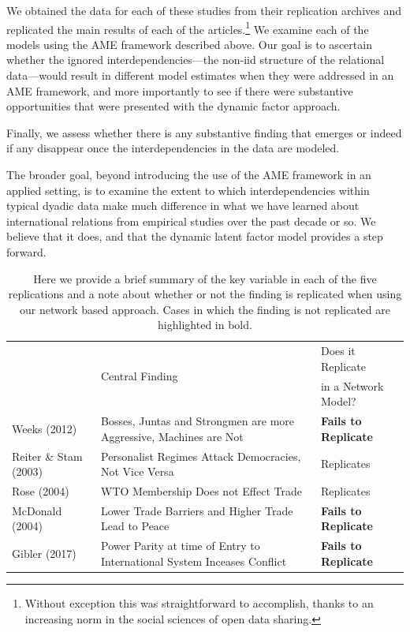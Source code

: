 \documentclass[12pt]{amsart}
\begin{document}
We obtained the data for each of these studies from their replication archives and replicated the main results of each of the articles.\footnote{Without exception this was straightforward to accomplish, thanks to an increasing norm in the social sciences of open data sharing.} We examine each of the models using the AME framework described above.  Our goal is to ascertain whether the ignored interdependencies---the non-iid structure of the relational data---would result in different model estimates when they were addressed in an AME framework, and more importantly to see if there were substantive opportunities that were presented with the dynamic factor approach.  

Finally, we assess whether there is any substantive finding that emerges or indeed if any disappear once the interdependencies in the data are modeled.

The broader goal, beyond introducing the use of the AME framework in an applied setting, is to examine the extent to which interdependencies within typical dyadic data make much difference in what we have learned about international relations from empirical studies over the past decade or so.  We believe that it does, and that the dynamic latent factor model provides a step forward.

\begin{table}[ht]
\centering
	\begin{tabular}{l| p{7cm} l}
	& \multirow{2}{*}{Central Finding} & Does it Replicate \\ 
	& &  in a Network Model? \\
	\hline\hline
		Weeks (2012) & Bosses, Juntas and Strongmen are more Aggressive, Machines are Not & \textbf{Fails to Replicate} \\
		\hline
		Reiter \& Stam (2003) & Personalist Regimes Attack Democracies, Not Vice Versa & Replicates \\ 
		\hline
		Rose (2004) & WTO Membership Does not Effect Trade & Replicates \\ 
		\hline
		McDonald (2004) & Lower Trade Barriers and Higher Trade Lead to Peace & \textbf{Fails to Replicate} \\ 
		\hline
		Gibler (2017) & Power Parity at time of Entry to International System Inceases Conflict & \textbf{Fails to Replicate} \\ 
	\hline\hline
	\end{tabular}
	\caption{Here we provide a brief summary of the key variable in each of the five replications and a note about whether or not the finding is replicated when using our network based approach. Cases in which the finding is not replicated are highlighted in bold.}
	\label{tab:modelFindingSumm}
\end{table}
\end{document}
